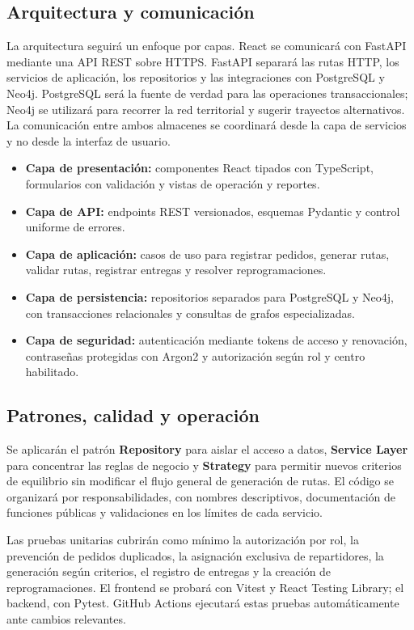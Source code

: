 \documentclass[12pt,a4paper]{article}
\begin{document}
\subsection{Arquitectura y comunicación}
La arquitectura seguirá un enfoque por capas. React se comunicará con FastAPI mediante una API REST sobre HTTPS. FastAPI separará las rutas HTTP, los servicios de aplicación, los repositorios y las integraciones con PostgreSQL y Neo4j. PostgreSQL será la fuente de verdad para las operaciones transaccionales; Neo4j se utilizará para recorrer la red territorial y sugerir trayectos alternativos. La comunicación entre ambos almacenes se coordinará desde la capa de servicios y no desde la interfaz de usuario.

\begin{itemize}
\item \textbf{Capa de presentación:} componentes React tipados con TypeScript, formularios con validación y vistas de operación y reportes.
\item \textbf{Capa de API:} endpoints REST versionados, esquemas Pydantic y control uniforme de errores.
\item \textbf{Capa de aplicación:} casos de uso para registrar pedidos, generar rutas, validar rutas, registrar entregas y resolver reprogramaciones.
\item \textbf{Capa de persistencia:} repositorios separados para PostgreSQL y Neo4j, con transacciones relacionales y consultas de grafos especializadas.
\item \textbf{Capa de seguridad:} autenticación mediante tokens de acceso y renovación, contraseñas protegidas con Argon2 y autorización según rol y centro habilitado.
\end{itemize}

\subsection{Patrones, calidad y operación}
Se aplicarán el patrón \textbf{Repository} para aislar el acceso a datos, \textbf{Service Layer} para concentrar las reglas de negocio y \textbf{Strategy} para permitir nuevos criterios de equilibrio sin modificar el flujo general de generación de rutas. El código se organizará por responsabilidades, con nombres descriptivos, documentación de funciones públicas y validaciones en los límites de cada servicio.

Las pruebas unitarias cubrirán como mínimo la autorización por rol, la prevención de pedidos duplicados, la asignación exclusiva de repartidores, la generación según criterios, el registro de entregas y la creación de reprogramaciones. El frontend se probará con Vitest y React Testing Library; el backend, con Pytest. GitHub Actions ejecutará estas pruebas automáticamente ante cambios relevantes.
\end{document}
